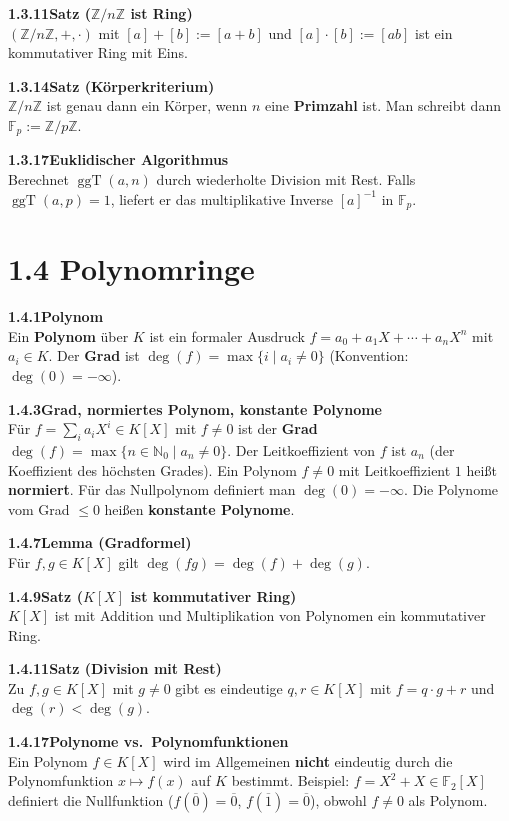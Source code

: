 \documentclass[a4paper,12pt]{article}
\newcommand{\gentry}[3]{%
  \noindent\textbf{#1\quad #2}\nopagebreak\\[0.2em]
  #3\par\smallskip
}
\begin{document}
\gentry{1.3.11}{Satz ($\mathbb{Z}/n\mathbb{Z}$ ist Ring)}{%
  $(\mathbb{Z}/n\mathbb{Z}, +, \cdot)$ mit $[a]+[b]:=[a+b]$ und $[a]\cdot[b]:=[ab]$ ist ein kommutativer Ring mit Eins.
}

\gentry{1.3.14}{Satz (Körperkriterium)}{%
  $\mathbb{Z}/n\mathbb{Z}$ ist genau dann ein Körper, wenn $n$ eine \textbf{Primzahl} ist. Man schreibt dann $\mathbb{F}_p := \mathbb{Z}/p\mathbb{Z}$.
}

\gentry{1.3.17}{Euklidischer Algorithmus}{%
  Berechnet $\operatorname{ggT}(a,n)$ durch wiederholte Division mit Rest. Falls $\operatorname{ggT}(a,p)=1$, liefert er das multiplikative Inverse $[a]^{-1}$ in $\mathbb{F}_p$.
}

\section*{1.4 \quad Polynomringe}

\gentry{1.4.1}{Polynom}{%
  Ein \textbf{Polynom} über $K$ ist ein formaler Ausdruck $f = a_0 + a_1 X + \cdots + a_n X^n$ mit $a_i \in K$. Der \textbf{Grad} ist $\deg(f) = \max\{i \mid a_i \neq 0\}$ (Konvention: $\deg(0) = -\infty$).
}

\gentry{1.4.3}{Grad, normiertes Polynom, konstante Polynome}{%
  Für $f = \sum_i a_i X^i \in K[X]$ mit $f \neq 0$ ist der \textbf{Grad} $\deg(f) = \max\{n \in \mathbb{N}_0 \mid a_n \neq 0\}$.
  Der Leitkoeffizient von $f$ ist $a_n$ (der Koeffizient des höchsten Grades). Ein Polynom $f \neq 0$ mit Leitkoeffizient $1$ heißt \textbf{normiert}.
  Für das Nullpolynom definiert man $\deg(0) = -\infty$. Die Polynome vom Grad $\leq 0$ heißen \textbf{konstante Polynome}.
}

\gentry{1.4.7}{Lemma (Gradformel)}{%
  Für $f, g \in K[X]$ gilt $\deg(fg) = \deg(f) + \deg(g)$.
}

\gentry{1.4.9}{Satz ($K[X]$ ist kommutativer Ring)}{$K[X]$ ist mit Addition und Multiplikation von Polynomen ein kommutativer Ring.}

\gentry{1.4.11}{Satz (Division mit Rest)}{%
  Zu $f, g \in K[X]$ mit $g \neq 0$ gibt es eindeutige $q, r \in K[X]$ mit $f = q \cdot g + r$ und $\deg(r) < \deg(g)$.
}

\gentry{1.4.17}{Polynome vs.\ Polynomfunktionen}{%
  Ein Polynom $f \in K[X]$ wird im Allgemeinen \textbf{nicht} eindeutig durch die Polynomfunktion $x \mapsto f(x)$ auf $K$ bestimmt.
  Beispiel: $f = X^2 + X \in \mathbb{F}_2[X]$ definiert die Nullfunktion ($f(\overline{0})=\overline{0}$, $f(\overline{1})=\overline{0}$),
  obwohl $f \neq 0$ als Polynom.
}
\end{document}
